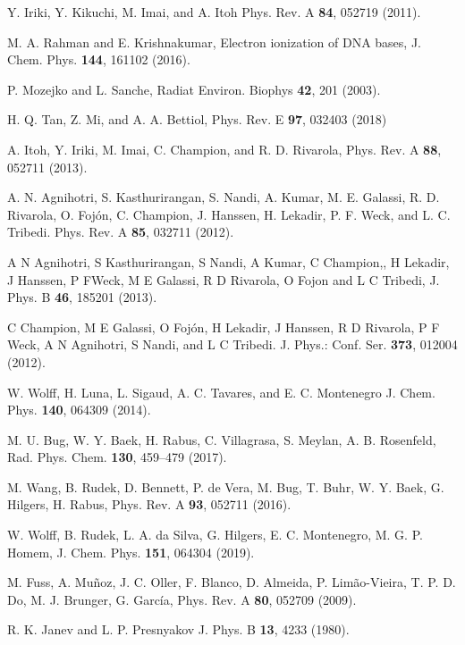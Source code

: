 \documentclass[10pt,showpacs,twocolumn]{revtex4}
\begin{document}
\begin{thebibliography}{}

Y. Iriki, Y. Kikuchi, M. Imai, and A. Itoh
Phys. Rev. A \textbf{84}, 052719 (2011).

M. A. Rahman and E. Krishnakumar,
Electron ionization of DNA bases,
J. Chem. Phys. \textbf{144}, 161102 (2016).

P. Mozejko and L. Sanche, 
Radiat Environ. Biophys \textbf{42}, 201 (2003).

H. Q. Tan, Z. Mi, and A. A. Bettiol, 
Phys. Rev. E \textbf{97}, 032403 (2018)

A. Itoh, Y. Iriki, M. Imai, C. Champion, and R. D. Rivarola, 
Phys. Rev. A \textbf{88}, 052711 (2013).

A. N. Agnihotri, S. Kasthurirangan, S. Nandi, A.
Kumar, M. E. Galassi, R. D. Rivarola, O. Foj\'{o}n, C. Champion, J. Hanssen,
H. Lekadir, P. F. Weck, and L. C. Tribedi. 
Phys. Rev. A \textbf{85}, 032711 (2012).

A N Agnihotri, S Kasthurirangan, S Nandi, A Kumar, C Champion,, H Lekadir, 
J Hanssen, P FWeck, M E Galassi, R D Rivarola, O Fojon and L C Tribedi, 
J. Phys. B \textbf{46}, 185201 (2013).

C Champion, M E Galassi, O Foj\'{o}n, H Lekadir, J Hanssen, R D Rivarola,
P F Weck, A N Agnihotri, S Nandi, and L C Tribedi. 
J. Phys.: Conf. Ser. \textbf{373}, 012004 (2012).

W. Wolff, H. Luna, L. Sigaud, A. C. Tavares, and E. C. Montenegro
J. Chem. Phys. \textbf{140}, 064309 (2014).

M. U. Bug, W. Y. Baek, H. Rabus, C. Villagrasa, S. Meylan, A. B. Rosenfeld,
Rad. Phys. Chem. \textbf{130}, 459--479 (2017).

M. Wang, B. Rudek, D. Bennett, P. de Vera, M. Bug, T. Buhr, W. Y. Baek, 
G. Hilgers, H. Rabus, 
Phys. Rev. A \textbf{93}, 052711 (2016).

W. Wolff, B. Rudek, L. A. da Silva, G. Hilgers, E. C. Montenegro, 
M. G. P. Homem,
J. Chem. Phys. \textbf{151}, 064304 (2019).

M. Fuss, A. Muñoz, J. C. Oller, F. Blanco, D. Almeida, P. Limão-Vieira, 
T. P. D. Do, M. J. Brunger, G. Garc\'{i}a,
Phys. Rev. A \textbf{80}, 052709 (2009).

R. K. Janev and L. P. Presnyakov 
J. Phys. B \textbf{13}, 4233 (1980).


\end{thebibliography}
\end{document}
